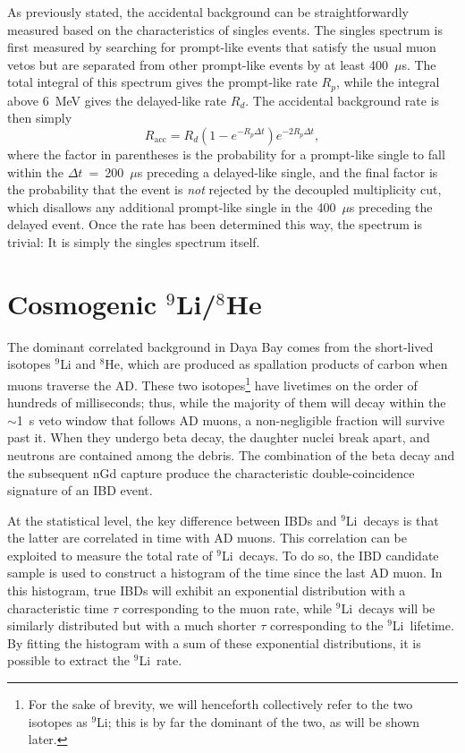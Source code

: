 \documentclass[../thesis.tex]{subfiles}
\begin{document}
As previously stated, the accidental background can be straightforwardly
measured based on the characteristics of singles events. The singles spectrum is
first measured by searching for prompt-like events that satisfy the usual muon
vetos but are separated from other prompt-like events by at least
400~$\mu$s. The total integral of this spectrum gives the prompt-like rate
$R_p$, while the integral above 6~MeV gives the delayed-like rate $R_d$. The
accidental background rate is then simply
\[ R_\mathrm{acc} = R_d(1 - e^{-R_p\Delta t})e^{-2R_p\Delta t}, \] where the
factor in parentheses is the probability for a prompt-like single to fall within
the $\Delta t$~=~200~$\mu$s preceding a delayed-like single, and the final
factor is the probability that the event is \emph{not} rejected by the decoupled
multiplicity cut, which disallows any additional prompt-like single in the
400~$\mu$s preceding the delayed event. Once the rate has been determined this
way, the spectrum is trivial: It is simply the singles spectrum itself.

\begin{comment}
  Mention IHEP's cross-check, and the additional uncertainty stemming from the
  difference between it and the nominal result?
\end{comment}

\section{Cosmogenic $^9$Li/$^8$He}
\label{sec:bkgCosmo}

\newcommand\linine{$^9$Li}

The dominant correlated background in Daya Bay comes from the short-lived
isotopes $^9$Li and $^8$He, which are produced as spallation products of carbon
when muons traverse the AD. These two isotopes\footnote{For the sake of brevity,
  we will henceforth collectively refer to the two isotopes as \linine; this is
  by far the dominant of the two, as will be shown later.} have livetimes on the
order of hundreds of milliseconds; thus, while the majority of them will decay
within the $\sim$1~s veto window that follows AD muons, a non-negligible
fraction will survive past it. When they undergo beta decay, the daughter nuclei
break apart, and neutrons are contained among the debris. The combination of the
beta decay and the subsequent nGd capture produce the characteristic
double-coincidence signature of an IBD event.

At the statistical level, the key difference between IBDs and \linine\ decays is
that the latter are correlated in time with AD muons. This correlation can be
exploited to measure the total rate of \linine\ decays. To do so, the IBD
candidate sample is used to construct a histogram of the time since the last AD
muon. In this histogram, true IBDs will exhibit an exponential distribution with
a characteristic time $\tau$ corresponding to the muon rate, while \linine\
decays will be similarly distributed but with a much shorter $\tau$
corresponding to the \linine\ lifetime. By fitting the histogram with a sum of
these exponential distributions, it is possible to extract the \linine\ rate.
\end{document}
